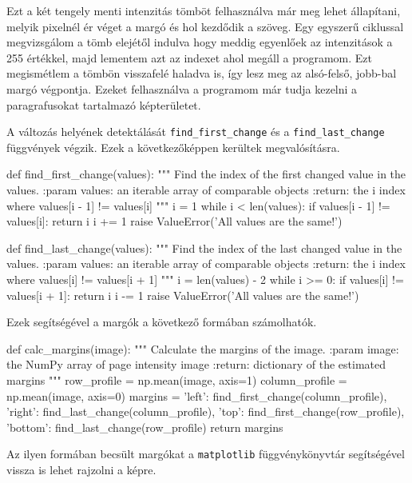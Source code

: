 Ezt a két tengely menti intenzitás tömböt felhasználva már meg lehet állapítani, melyik pixelnél ér véget a margó és hol kezdődik a szöveg. Egy egyszerű ciklussal megvizsgálom a tömb elejétől indulva hogy meddig egyenlőek az intenzitások a 255 értékkel, majd lementem azt az indexet ahol megáll a programom. Ezt megismétlem a tömbön visszafelé haladva is, így lesz meg az alsó-felső, jobb-bal margó végpontja. Ezeket felhasználva a programom már tudja kezelni a paragrafusokat tartalmazó képterületet.

A változás helyének detektálását \texttt{find\_first\_change} és a \texttt{find\_last\_change} függvények végzik.
Ezek a következőképpen kerültek megvalósításra.
\begin{python}
def find_first_change(values):
    """
    Find the index of the first changed value in the values.
    :param values: an iterable array of comparable objects
    :return: the i index where values[i - 1] != values[i]
    """
    i = 1
    while i < len(values):
        if values[i - 1] != values[i]:
            return i
        i += 1
    raise ValueError('All values are the same!')
\end{python}

\begin{python}
def find_last_change(values):
    """
    Find the index of the last changed value in the values.
    :param values: an iterable array of comparable objects
    :return: the i index where values[i] != values[i + 1]
    """
    i = len(values) - 2
    while i >= 0:
        if values[i] != values[i + 1]:
            return i
        i -= 1
    raise ValueError('All values are the same!')
\end{python} 
Ezek segítségével a margók a következő formában számolhatók.
\begin{python}
def calc_margins(image):
    """
    Calculate the margins of the image.
    :param image: the NumPy array of page intensity image
    :return: dictionary of the estimated margins
    """
    row_profile = np.mean(image, axis=1)
    column_profile = np.mean(image, axis=0)
    margins = {
        'left': find_first_change(column_profile),
        'right': find_last_change(column_profile),
        'top': find_first_change(row_profile),
        'bottom': find_last_change(row_profile)
    }
    return margins
\end{python}
Az ilyen formában becsült margókat a \texttt{matplotlib} függvénykönyvtár segítségével vissza is lehet rajzolni a képre.


